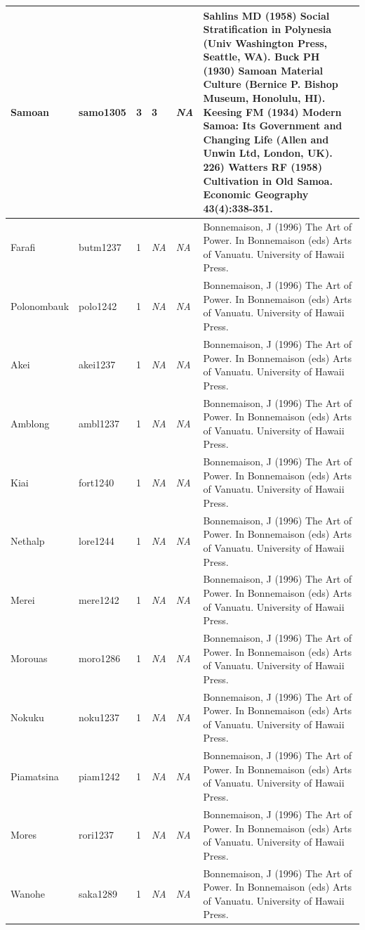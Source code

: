 \documentclass[a4paper,10pt]{article} %
\begin{document}
\begin{landscape}
\begin{longtable}{ | p{2cm}| p{2cm}| p{1.8cm}| p{1.8cm}| p{3cm}| p{9cm}| }
Samoan&samo1305&3&3&\emph{NA}&Sahlins MD (1958) Social Stratification in Polynesia (Univ Washington Press, Seattle, WA). Buck PH (1930) Samoan Material Culture (Bernice P. Bishop Museum, Honolulu, HI). Keesing FM (1934) Modern Samoa: Its Government and Changing Life (Allen and Unwin Ltd, London, UK). 226) Watters RF (1958) Cultivation in Old Samoa. Economic Geography 43(4):338-351. \\ \hline
Farafi&butm1237&1&\emph{NA}&\emph{NA}&Bonnemaison, J (1996) The Art of Power. In Bonnemaison (eds) Arts of Vanuatu. University of Hawaii Press.\\ \hline
Polonombauk&polo1242&1&\emph{NA}&\emph{NA}&Bonnemaison, J (1996) The Art of Power. In Bonnemaison (eds) Arts of Vanuatu. University of Hawaii Press.\\ \hline
Akei&akei1237&1&\emph{NA}&\emph{NA}&Bonnemaison, J (1996) The Art of Power. In Bonnemaison (eds) Arts of Vanuatu. University of Hawaii Press.\\ \hline
Amblong&ambl1237&1&\emph{NA}&\emph{NA}&Bonnemaison, J (1996) The Art of Power. In Bonnemaison (eds) Arts of Vanuatu. University of Hawaii Press.\\ \hline
Kiai&fort1240&1&\emph{NA}&\emph{NA}&Bonnemaison, J (1996) The Art of Power. In Bonnemaison (eds) Arts of Vanuatu. University of Hawaii Press.\\ \hline
Nethalp&lore1244&1&\emph{NA}&\emph{NA}&Bonnemaison, J (1996) The Art of Power. In Bonnemaison (eds) Arts of Vanuatu. University of Hawaii Press.\\ \hline
Merei&mere1242&1&\emph{NA}&\emph{NA}&Bonnemaison, J (1996) The Art of Power. In Bonnemaison (eds) Arts of Vanuatu. University of Hawaii Press.\\ \hline
Morouas&moro1286&1&\emph{NA}&\emph{NA}&Bonnemaison, J (1996) The Art of Power. In Bonnemaison (eds) Arts of Vanuatu. University of Hawaii Press.\\ \hline
Nokuku&noku1237&1&\emph{NA}&\emph{NA}&Bonnemaison, J (1996) The Art of Power. In Bonnemaison (eds) Arts of Vanuatu. University of Hawaii Press.\\ \hline
Piamatsina&piam1242&1&\emph{NA}&\emph{NA}&Bonnemaison, J (1996) The Art of Power. In Bonnemaison (eds) Arts of Vanuatu. University of Hawaii Press.\\ \hline
Mores&rori1237&1&\emph{NA}&\emph{NA}&Bonnemaison, J (1996) The Art of Power. In Bonnemaison (eds) Arts of Vanuatu. University of Hawaii Press.\\ \hline
Wanohe&saka1289&1&\emph{NA}&\emph{NA}&Bonnemaison, J (1996) The Art of Power. In Bonnemaison (eds) Arts of Vanuatu. University of Hawaii Press.\\ \hline

\end{longtable}
\end{landscape}
\end{document}

